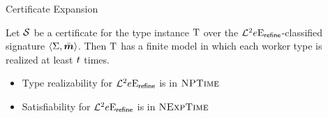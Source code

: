 \documentclass{beamer}
\begin{document}
\begin{frame}{Certificate Expansion}
\begin{theorem}
Let $\mathcal{S}$ be a certificate for the type instance $\mathrm{T}$ over the
$\mathcal{L}^{2}{e}\mathrm{E}_{\mathsf{refine}}$-classified signature $\left\langle \Sigma,\bar{\bm{m}} \right\rangle$.
Then $\mathrm{T}$ has a finite model in which each worker type is realized at least
$t$ times.
\end{theorem}
\begin{itemize}
  \item Type realizability for $\mathcal{L}^{2}{e}\mathrm{E}_{\mathsf{refine}}$ is in
  $\text{\normalfont{\scshape NPTime}}$
  \item Satisfiability for $\mathcal{L}^{2}{e}\mathrm{E}_{\mathsf{refine}}$ is in
  $\text{\normalfont{\scshape NExpTime}}$
\end{itemize}
\end{frame}
\end{document}

